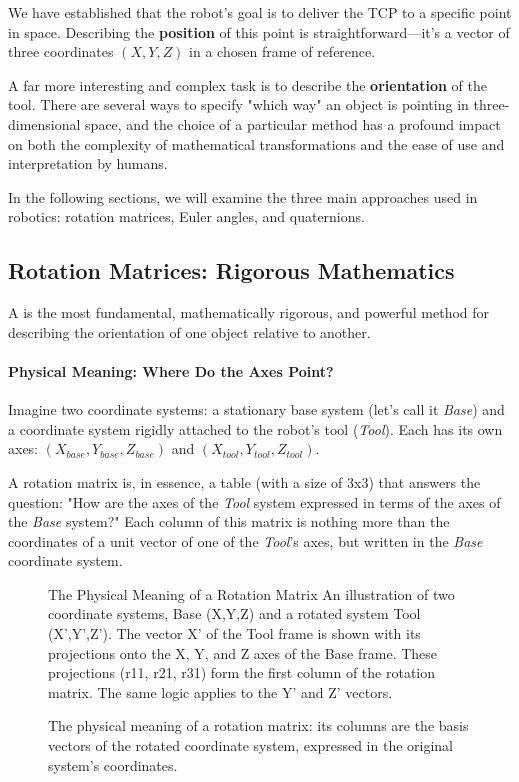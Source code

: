 We have established that the robot's goal is to deliver the TCP to a specific point in space. Describing the \textbf{position} of this point is straightforward—it's a vector of three coordinates $(X, Y, Z)$ in a chosen frame of reference.

A far more interesting and complex task is to describe the \textbf{orientation} of the tool. There are several ways to specify "which way" an object is pointing in three-dimensional space, and the choice of a particular method has a profound impact on both the complexity of mathematical transformations and the ease of use and interpretation by humans.

In the following sections, we will examine the three main approaches used in robotics: rotation matrices, Euler angles, and quaternions.

\subsection{Rotation Matrices: Rigorous Mathematics}
\label{sec:rotation_matrix}

A  is the most fundamental, mathematically rigorous, and powerful method for describing the orientation of one object relative to another.

\paragraph{Physical Meaning: Where Do the Axes Point?}
Imagine two coordinate systems: a stationary base system (let's call it \textit{Base}) and a coordinate system rigidly attached to the robot's tool (\textit{Tool}). Each has its own axes: $(X_{base}, Y_{base}, Z_{base})$ and $(X_{tool}, Y_{tool}, Z_{tool})$.

A rotation matrix is, in essence, a table (with a size of 3x3) that answers the question: "How are the axes of the \textit{Tool} system expressed in terms of the axes of the \textit{Base} system?" Each column of this matrix is nothing more than the coordinates of a unit vector of one of the \textit{Tool}'s axes, but written in the \textit{Base} coordinate system.

\begin{figure}[h!]
    \centering
    \begin{infobox}{The Physical Meaning of a Rotation Matrix}
        An illustration of two coordinate systems, Base (X,Y,Z) and a rotated system Tool (X',Y',Z'). The vector X' of the Tool frame is shown with its projections onto the X, Y, and Z axes of the Base frame. These projections (r11, r21, r31) form the first column of the rotation matrix. The same logic applies to the Y' and Z' vectors.
    \end{infobox}
    \caption{The physical meaning of a rotation matrix: its columns are the basis vectors of the rotated coordinate system, expressed in the original system's coordinates.}
    \label{fig:rotation_matrix_meaning}
\end{figure}

